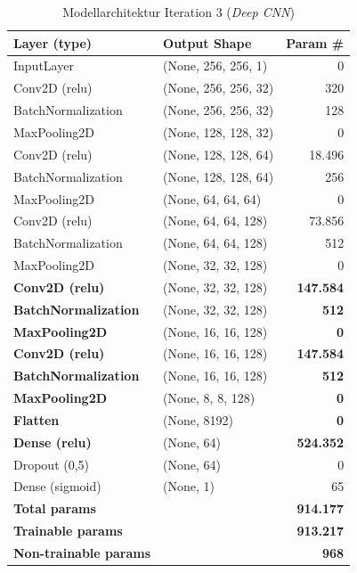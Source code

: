 \documentclass[
    a4paper,        %
    11pt,           %
    ngerman,        %
    parskip=half,   %
    listof=totoc,   %
    bibliography=totoc %
]{scrartcl}
\begin{document}
\begin{table}[H]
    \centering
    \caption{Modellarchitektur Iteration 3 (\textit{Deep CNN})}
    \label{tab:model_summary_iter3}
    \begin{tabular}{llr}
        \toprule
        \textbf{Layer (type)} & \textbf{Output Shape} & \textbf{Param \#} \\
        \midrule
        InputLayer & (None, 256, 256, 1) & 0 \\
        Conv2D (relu) & (None, 256, 256, 32) & 320 \\
        BatchNormalization & (None, 256, 256, 32) & 128 \\
        MaxPooling2D & (None, 128, 128, 32) & 0 \\
        Conv2D (relu) & (None, 128, 128, 64) & 18.496 \\
        BatchNormalization & (None, 128, 128, 64) & 256 \\
        MaxPooling2D & (None, 64, 64, 64) & 0 \\
        Conv2D (relu) & (None, 64, 64, 128) & 73.856 \\
        BatchNormalization & (None, 64, 64, 128) & 512 \\
        MaxPooling2D & (None, 32, 32, 128) & 0 \\
        \textbf{Conv2D (relu)} & (None, 32, 32, 128) & \textbf{147.584} \\
        \textbf{BatchNormalization} & (None, 32, 32, 128) & \textbf{512} \\
        \textbf{MaxPooling2D} & (None, 16, 16, 128) & \textbf{0} \\
        \textbf{Conv2D (relu)} & (None, 16, 16, 128) & \textbf{147.584} \\
        \textbf{BatchNormalization} & (None, 16, 16, 128) & \textbf{512} \\
        \textbf{MaxPooling2D} & (None, 8, 8, 128) & \textbf{0} \\
        \textbf{Flatten} & (None, 8192) & \textbf{0} \\
        \textbf{Dense (relu)} & (None, 64) & \textbf{524.352} \\
        Dropout (0,5) & (None, 64) & 0 \\
        Dense (sigmoid) & (None, 1) & 65 \\
        \midrule
        \textbf{Total params} & & \textbf{914.177} \\
        \textbf{Trainable params} & & \textbf{913.217} \\
        \textbf{Non-trainable params} & & \textbf{968} \\
        \bottomrule
    \end{tabular}
\end{table}
\end{document}
